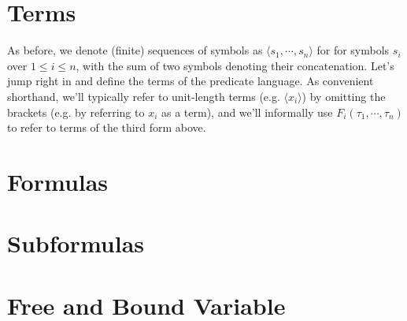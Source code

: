 \documentclass{article}
\begin{document}
\section{Terms}
As before, we denote (finite) sequences of symbols as $ \langle s_1, \cdots, s_n \rangle $ for for symbols $ s_i $ over $ 1 \leq i \leq n $, with the sum of two symbols denoting their concatenation. Let's jump right in and define the terms of the predicate language.
As convenient shorthand, we'll typically refer to unit-length terms (e.g. $ \langle x_i \rangle $) by omitting the brackets (e.g. by referring to $ x_i $ as a term), and we'll informally use $ F_i(\tau_1, \cdots, \tau_n) $ to refer to terms of the third form above.

\section{Formulas}

\section{Subformulas}

\section{Free and Bound Variable}
\end{document}
